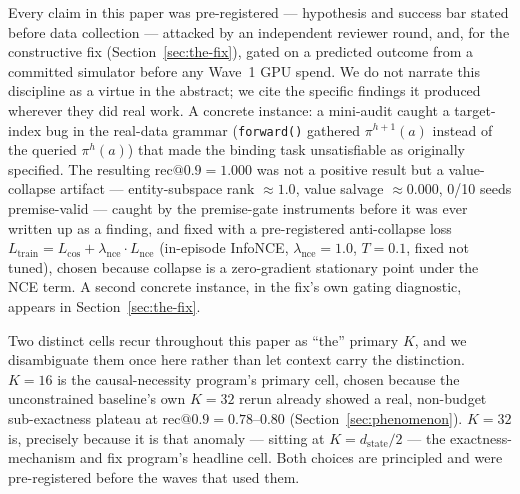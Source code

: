 Every claim in this paper was pre-registered --- hypothesis and success
bar stated before data collection --- attacked by an independent
reviewer round, and, for the constructive fix
(Section~\ref{sec:the-fix}), gated on a predicted outcome from a
committed simulator before any Wave~1 GPU spend. We do not narrate this
discipline as a virtue in the abstract; we cite the specific findings it
produced wherever they did real work. A concrete instance: a mini-audit
caught a target-index bug in the real-data grammar (\texttt{forward()}
gathered $\pi^{h+1}(a)$ instead of the queried $\pi^h(a)$) that made the
binding task unsatisfiable as originally specified. The resulting
$\mathrm{rec@0.9}{=}1.000$ was not a positive result but a
value-collapse artifact --- entity-subspace rank $\approx1.0$, value
salvage $\approx0.000$, 0/10 seeds premise-valid --- caught by the
premise-gate instruments before it was ever written up as a finding, and
fixed with a pre-registered anti-collapse loss $L_{\mathrm{train}} =
L_{\cos} + \lambda_{\mathrm{nce}}\cdot L_{\mathrm{nce}}$ (in-episode
InfoNCE, $\lambda_{\mathrm{nce}}{=}1.0$, $T{=}0.1$, fixed not tuned),
chosen because collapse is a zero-gradient stationary point under the
NCE term. A second concrete instance, in the fix's own gating diagnostic,
appears in Section~\ref{sec:the-fix}.

Two distinct cells recur throughout this paper as ``the'' primary $K$,
and we disambiguate them once here rather than let context carry the
distinction. $K{=}16$ is the causal-necessity program's primary cell,
chosen because the unconstrained baseline's own $K{=}32$ rerun already
showed a real, non-budget sub-exactness plateau at
$\mathrm{rec@0.9}{=}0.78$--$0.80$ (Section~\ref{sec:phenomenon}).
$K{=}32$ is, precisely because it is that anomaly --- sitting at
$K{=}d_{\mathrm{state}}/2$ --- the exactness-mechanism and fix program's
headline cell. Both choices are principled and were pre-registered before
the waves that used them.
